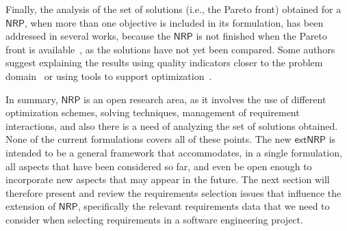 Finally, the analysis of the set of solutions (i.e., the Pareto front) obtained for a \ensuremath{\mathsf{NRP}}, when more than one objective is included in its formulation, has been addressed in several works,  because the \ensuremath{\mathsf{NRP}} is not finished when the Pareto front is available~\cite{ferreira2007}, as the solutions have not yet been compared. Some authors suggest explaining the results using quality indicators closer to the problem domain~\cite{aguila2016} or using tools to support optimization~\cite{zhang2020,aguila2016}.

In summary, \ensuremath{\mathsf{NRP}} is an open research area, as it involves the use of different optimization schemes, solving techniques, management of requirement interactions, and also there is a need of analyzing the set of solutions obtained. None of the current formulations covers all of these points. The new \ensuremath{\mathsf{extNRP}} is intended to be a general framework that accommodates, in a single formulation, all aspects that have been considered so far, and even be open enough to incorporate new aspects that may appear in the future.  The next section will therefore present and review the requirements selection issues that influence the extension of \ensuremath{\mathsf{NRP}}, specifically the relevant requirements data that we need to consider when selecting requirements in a software engineering project.